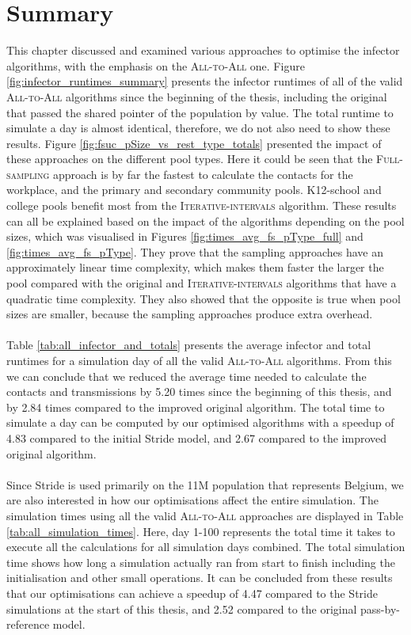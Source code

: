 \section{Summary}
\label{sec:summary}
This chapter discussed and examined various approaches to optimise the infector algorithms, with the emphasis on the \textsc{All-to-All} one. Figure \ref{fig:infector_runtimes_summary} presents the infector runtimes of all of the valid \textsc{All-to-All} algorithms since the beginning of the thesis, including the original that passed the shared pointer of the population by value. The total runtime to simulate a day is almost identical, therefore, we do not also need to show these results. Figure \ref{fig:fsuc_pSize_vs_rest_type_totals} presented the impact of these approaches on the different pool types. Here it could be seen that the \textsc{Full-sampling} approach is by far the fastest to calculate the contacts for the workplace, and the primary and secondary community pools. K12-school and college pools benefit  most from the \textsc{Iterative-intervals} algorithm. These results can all be explained based on the impact of the algorithms depending on the pool sizes, which was visualised in Figures \ref{fig:times_avg_fs_pType_full} and \ref{fig:times_avg_fs_pType}. They prove that the sampling approaches have an approximately linear time complexity, which makes them faster the larger the pool compared with the original and \textsc{Iterative-intervals} algorithms that have a quadratic time complexity. They also showed that the opposite is true when pool sizes are smaller, because the sampling approaches produce extra overhead.
\\\\
Table \ref{tab:all_infector_and_totals} presents the average infector and total runtimes for a simulation day of all the valid \textsc{All-to-All} algorithms. From this we can conclude that we reduced the average time needed to calculate the contacts and transmissions by 5.20 times since the beginning of this thesis, and by 2.84 times compared to the improved original algorithm. The total time to simulate a day can be computed by our optimised algorithms with a speedup of 4.83 compared to the initial Stride model, and 2.67 compared to the improved original algorithm.
\\\\
Since Stride is used primarily on the 11M population that represents Belgium, we are also interested in how our optimisations affect the entire simulation. The simulation times using all the valid \textsc{All-to-All} approaches are displayed in Table \ref{tab:all_simulation_times}. Here, day 1-100 represents the total time it takes to execute all the calculations for all simulation days combined. The total simulation time shows how long a simulation actually ran from start to finish including the initialisation and other small operations. It can be concluded from these results that our optimisations can achieve a speedup of 4.47 compared to the Stride simulations at the start of this thesis, and 2.52 compared to the original pass-by-reference model.
